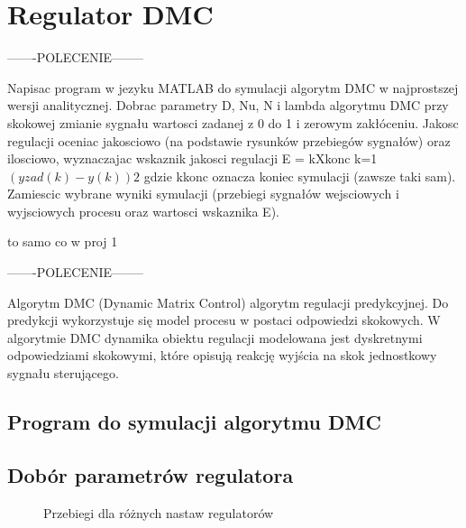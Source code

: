 \section{Regulator DMC}
\label{projekt:zad4}
-------POLECENIE--------

Napisac program w jezyku MATLAB do symulacji algorytm DMC w najprostszej
wersji analitycznej. Dobrac parametry D, Nu, N i lambda algorytmu DMC przy skokowej
zmianie sygnału wartosci zadanej z 0 do 1 i zerowym zakłóceniu. Jakosc regulacji
oceniac jakosciowo (na podstawie rysunków przebiegów sygnałów) oraz ilosciowo, wyznaczajac
wskaznik jakosci regulacji
E =
kXkonc
k=1
$(yzad(k) - y(k))2$
gdzie kkonc oznacza koniec symulacji (zawsze taki sam). Zamiescic wybrane wyniki
symulacji (przebiegi sygnałów wejsciowych i wyjsciowych procesu oraz wartosci wskaznika
E).

to samo co w proj 1

-------POLECENIE--------


Algorytm DMC (Dynamic Matrix Control) algorytm regulacji predykcyjnej. 
Do predykcji wykorzystuje się model procesu w postaci odpowiedzi skokowych. 
W algorytmie DMC dynamika obiektu regulacji modelowana jest dyskretnymi odpowiedziami skokowymi, 
które opisują reakcję wyjścia na skok jednostkowy sygnału sterującego.
 


\subsection{Program do symulacji algorytmu DMC}
\label{projekt:zad4:programDMC}

\subsection{Dobór parametrów regulatora}
\label{projekt:zad4:parametry}

\begin{figure}[H] 
    \centering
    
    \caption{Przebiegi dla różnych nastaw regulatorów}
    \label{projekt:zad4:parametry:figure}
\end{figure}
